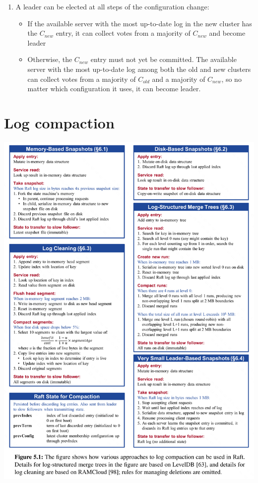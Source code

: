 \documentclass[11pt]{article}
\begin{document}
\begin{enumerate}
\item A leader can be elected at all steps of the configuration change:
\begin{itemize}
\item If the available server with the most up-to-date log in the new cluster has the \(C_{new}\)
entry, it can collect votes from a majority of \(C_{new}\) and become leader
\item Otherwise, the \(C_{new}\) entry must not yet be committed. The available server with the most
up-to-date log among both the old and new clusters can collect votes from a majority of
\(C_{old}\) and a majority of \(C_{new}\), so no matter which configuration it uses, it can
become leader.
\end{itemize}
\end{enumerate}
\section{Log compaction}
\label{sec:org1ed09e3}
\begin{center}
\includegraphics[width=.99\textwidth]{../../images/papers/23.png}
\label{}
\end{center}
\end{document}
